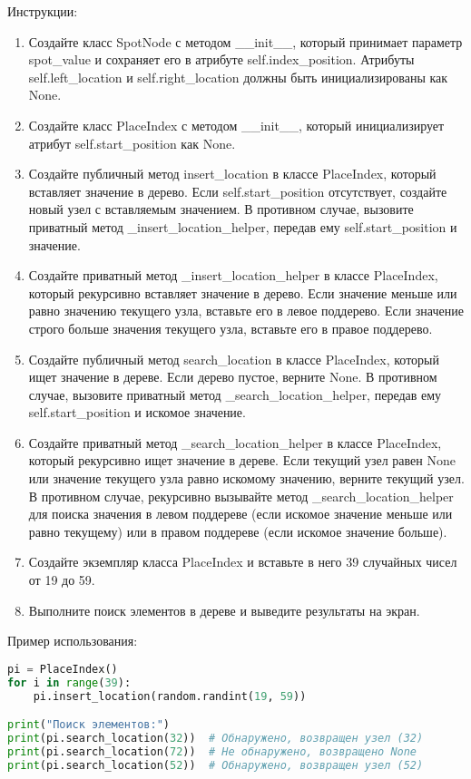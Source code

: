 \begin{enumerate}
Инструкции:
\begin{enumerate}
    \item Создайте класс SpotNode с методом \_\_init\_\_, который принимает параметр spot\_value и сохраняет его в атрибуте self.index\_position. Атрибуты self.left\_location и self.right\_location должны быть инициализированы как None.
    \item Создайте класс PlaceIndex с методом \_\_init\_\_, который инициализирует атрибут self.start\_position как None.
    \item Создайте публичный метод insert\_location в классе PlaceIndex, который вставляет значение в дерево. Если self.start\_position отсутствует, создайте новый узел с вставляемым значением. В противном случае, вызовите приватный метод \_insert\_location\_helper, передав ему self.start\_position и значение.
    \item Создайте приватный метод \_insert\_location\_helper в классе PlaceIndex, который рекурсивно вставляет значение в дерево. Если значение меньше или равно значению текущего узла, вставьте его в левое поддерево. Если значение строго больше значения текущего узла, вставьте его в правое поддерево.
    \item Создайте публичный метод search\_location в классе PlaceIndex, который ищет значение в дереве. Если дерево пустое, верните None. В противном случае, вызовите приватный метод \_search\_location\_helper, передав ему self.start\_position и искомое значение.
    \item Создайте приватный метод \_search\_location\_helper в классе PlaceIndex, который рекурсивно ищет значение в дереве. Если текущий узел равен None или значение текущего узла равно искомому значению, верните текущий узел. В противном случае, рекурсивно вызывайте метод \_search\_location\_helper для поиска значения в левом поддереве (если искомое значение меньше или равно текущему) или в правом поддереве (если искомое значение больше).
    \item Создайте экземпляр класса PlaceIndex и вставьте в него 39 случайных чисел от 19 до 59.
    \item Выполните поиск элементов в дереве и выведите результаты на экран.
\end{enumerate}

Пример использования:
\begin{lstlisting}[language=Python]
pi = PlaceIndex()
for i in range(39):
    pi.insert_location(random.randint(19, 59))

print("Поиск элементов:")
print(pi.search_location(32))  # Обнаружено, возвращен узел (32)
print(pi.search_location(72))  # Не обнаружено, возвращено None
print(pi.search_location(52))  # Обнаружено, возвращен узел (52)
\end{lstlisting}


\end{enumerate}
